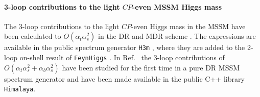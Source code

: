 \documentclass[final,3p,11pt,pdflatex]{elsarticle}
\makeatletter
\newcommand{\htm}{\texttt{H3m}\@\xspace}
\newcommand{\Himalaya}{\texttt{Himalaya}\@\xspace}
\newcommand{\FeynHiggs}{\texttt{FeynHiggs}\@\xspace}
\newcommand{\ol}[1]{\overline{#1}}
\newcommand{\DRbar}{\ensuremath{\ol{\text{DR}}}\xspace}
\newcommand{\MDRbar}{\ensuremath{\ol{\text{MDR}}}\xspace}
\newcommand{\CP}{\ensuremath{CP}\xspace}
\def\at{\alpha_t}
\def\ab{\alpha_b}
\def\as{\alpha_s}
\makeatother
\begin{document}
\paragraph{3-loop contributions to the light \CP-even MSSM Higgs mass}

The 3-loop contributions to the light \CP-even Higgs mass in the MSSM
have been calculated to $O(\at\as^2)$ in the \DRbar and
\MDRbar scheme \cite{Harlander:2008ju,Kant:2010tf,Kunz:2014gya}.  The
expressions are available in the public spectrum generator \htm
\cite{h3murl}, where they are added to the 2-loop on-shell result of
\FeynHiggs
\cite{Heinemeyer:1998yj,Heinemeyer:1998np,Degrassi:2002fi,Frank:2006yh,Hahn:2013ria,Drechsel:2016jdg,Bahl:2016brp,Bahl:2017aev}.
In Ref.~\cite{Harlander:2017kuc} the 3-loop contributions of
$O(\at\as^2 + \ab\as^2)$ have been studied for the first time in a
pure \DRbar MSSM spectrum generator and have been made available in
the public C++ library \Himalaya \cite{himalaya}.
\end{document}
